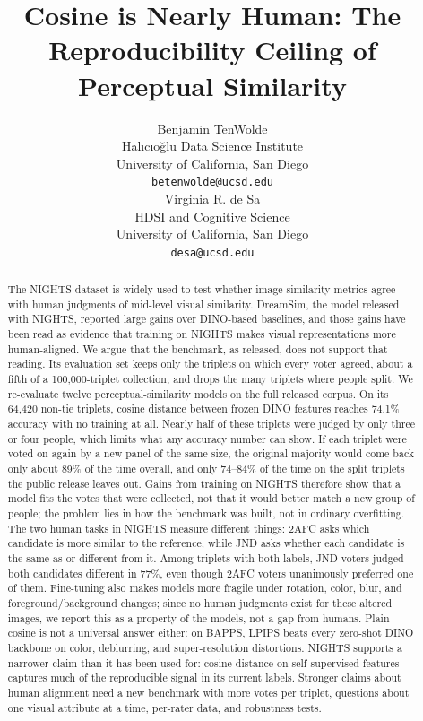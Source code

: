 \documentclass{article}
\title{Cosine is Nearly Human: The Reproducibility Ceiling of Perceptual Similarity}
\author{%
  Benjamin TenWolde \\
  Hal{\i}c{\i}o\u{g}lu Data Science Institute\\
  University of California, San Diego\\
  \texttt{betenwolde@ucsd.edu} \\
  \And
  Virginia R. de Sa \\
  HDSI and Cognitive Science\\
  University of California, San Diego\\
  \texttt{desa@ucsd.edu}
}
\begin{document}
\maketitle

\begin{abstract}
The NIGHTS dataset is widely used to test whether image-similarity metrics agree with human judgments of mid-level visual similarity. DreamSim, the model released with NIGHTS, reported large gains over DINO-based baselines, and those gains have been read as evidence that training on NIGHTS makes visual representations more human-aligned. We argue that the benchmark, as released, does not support that reading. Its evaluation set keeps only the triplets on which every voter agreed, about a fifth of a 100{,}000-triplet collection, and drops the many triplets where people split. We re-evaluate twelve perceptual-similarity models on the full released corpus. On its 64{,}420 non-tie triplets, cosine distance between frozen DINO features reaches 74.1\% accuracy with no training at all. Nearly half of these triplets were judged by only three or four people, which limits what any accuracy number can show. If each triplet were voted on again by a new panel of the same size, the original majority would come back only about 89\% of the time overall, and only 74--84\% of the time on the split triplets the public release leaves out. Gains from training on NIGHTS therefore show that a model fits the votes that were collected, not that it would better match a new group of people; the problem lies in how the benchmark was built, not in ordinary overfitting. The two human tasks in NIGHTS measure different things: 2AFC asks which candidate is more similar to the reference, while JND asks whether each candidate is the same as or different from it. Among triplets with both labels, JND voters judged both candidates different in 77\%, even though 2AFC voters unanimously preferred one of them. Fine-tuning also makes models more fragile under rotation, color, blur, and foreground/background changes; since no human judgments exist for these altered images, we report this as a property of the models, not a gap from humans. Plain cosine is not a universal answer either: on BAPPS, LPIPS beats every zero-shot DINO backbone on color, deblurring, and super-resolution distortions. NIGHTS supports a narrower claim than it has been used for: cosine distance on self-supervised features captures much of the reproducible signal in its current labels. Stronger claims about human alignment need a new benchmark with more votes per triplet, questions about one visual attribute at a time, per-rater data, and robustness tests.
\end{abstract}
\end{document}
